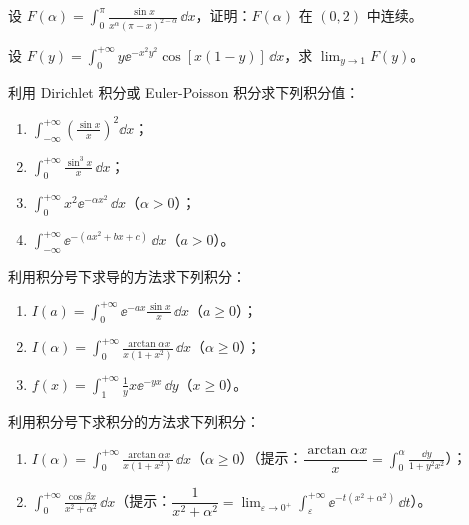 \begin{xexercise}[5]
设 $F(\alpha)=\displaystyle\int_0^\pi\frac{\sin x}{x^\alpha(\pi-x)^{2-\alpha}}\,\dd x$，证明：$F(\alpha)$ 在 $(0,2)$ 中连续。
\end{xexercise}

\begin{xexercise}[6]
设 $F(y)=\displaystyle\int_0^{+\infty}y\ee^{-x^2y^2}\cos[x(1-y)]\,\dd x$，求 $\displaystyle\lim_{y\to1}F(y)$。
\end{xexercise}

\begin{xexercise}[7]
利用 Dirichlet 积分或 Euler-Poisson 积分求下列积分值：
  \begin{enumerate}[label=(\arabic*)]
    \item $\displaystyle\int_{-\infty}^{+\infty}\left(\frac{\sin x}{x}\right)^2\dd x$；
    \item $\displaystyle\int_0^{+\infty}\frac{\sin^3x}{x}\,\dd x$；
    \item $\displaystyle\int_0^{+\infty}x^2\ee^{-\alpha x^2}\,\dd x$（$\alpha>0$）；
    \item $\displaystyle\int_{-\infty}^{+\infty}\ee^{-(ax^2+bx+c)}\,\dd x$（$a>0$）。
  \end{enumerate}
\end{xexercise}

\begin{xexercise}[8]
利用积分号下求导的方法求下列积分：
  \begin{enumerate}[label=(\arabic*)]
    \item $I(a)=\displaystyle\int_0^{+\infty}\ee^{-ax}\frac{\sin x}{x}\,\dd x$（$a\geqslant0$）；
    \item $I(\alpha)=\displaystyle\int_0^{+\infty}\frac{\arctan\alpha x}{x(1+x^2)}\,\dd x$（$\alpha\geqslant0$）；
    \item $f(x)=\displaystyle\int_1^{+\infty}\frac1y x\ee^{-yx}\,\dd y$（$x\geqslant0$）。
  \end{enumerate}
\end{xexercise}

\begin{xexercise}[9]
利用积分号下求积分的方法求下列积分：
  \begin{enumerate}[label=(\arabic*)]
    \item $I(\alpha)=\displaystyle\int_0^{+\infty}\frac{\arctan\alpha x}{x(1+x^2)}\,\dd x$（$\alpha\geqslant0$）（提示：$\dfrac{\arctan\alpha x}{x}=\displaystyle\int_0^\alpha\frac{\dd y}{1+y^2x^2}$）；
    \item $\displaystyle\int_0^{+\infty}\frac{\cos\beta x}{x^2+\alpha^2}\,\dd x$（提示：$\dfrac1{x^2+\alpha^2}=\displaystyle\lim_{\varepsilon\to0^+}\int_\varepsilon^{+\infty}\ee^{-t(x^2+\alpha^2)}\,\dd t$）。
  \end{enumerate}
\end{xexercise}

